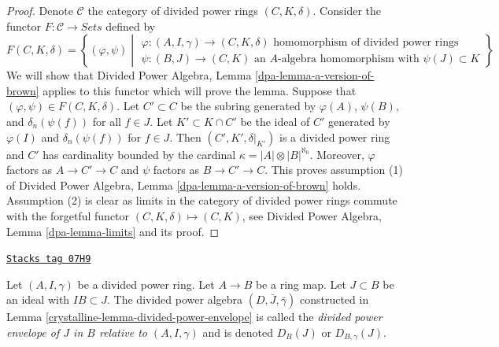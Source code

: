 \begin{proof}
Denote $\mathcal{C}$ the category of divided power rings
$(C, K, \delta)$. Consider the functor
$F : \mathcal{C} \longrightarrow \textit{Sets}$ defined by
$$
F(C, K, \delta) =
\left\{
(\varphi, \psi)
\middle|
\begin{matrix}
\varphi : (A, I, \gamma) \to (C, K, \delta)
\text{ homomorphism of divided power rings} \\
\psi : (B, J) \to (C, K)\text{ an }
A\text{-algebra homomorphism with }\psi(J) \subset K
\end{matrix}
\right\}
$$
We will show that
Divided Power Algebra, Lemma \ref{dpa-lemma-a-version-of-brown}
applies to this functor which will
prove the lemma. Suppose that $(\varphi, \psi) \in F(C, K, \delta)$.
Let $C' \subset C$ be the subring generated by $\varphi(A)$,
$\psi(B)$, and $\delta_n(\psi(f))$ for all $f \in J$.
Let $K' \subset K \cap C'$ be the ideal of $C'$ generated by
$\varphi(I)$ and $\delta_n(\psi(f))$ for $f \in J$.
Then $(C', K', \delta|_{K'})$ is a divided power ring and
$C'$ has cardinality bounded by the cardinal
$\kappa = |A| \otimes |B|^{\aleph_0}$.
Moreover, $\varphi$ factors as $A \to C' \to C$ and $\psi$ factors
as $B \to C' \to C$. This proves assumption (1) of
Divided Power Algebra, Lemma \ref{dpa-lemma-a-version-of-brown}
holds. Assumption (2) is clear
as limits in the category of divided power rings commute with the
forgetful functor $(C, K, \delta) \mapsto (C, K)$, see
Divided Power Algebra, Lemma \ref{dpa-lemma-limits} and its proof.
\end{proof}

\begin{definition}
\label{crystalline-definition-divided-power-envelope}
\href{https://stacks.math.columbia.edu/tag/07H9}{\texttt{Stacks tag 07H9}}

Let $(A, I, \gamma)$ be a divided power ring.
Let $A \to B$ be a ring map. Let $J \subset B$ be an ideal
with $IB \subset J$. The divided power algebra $(D, \bar J, \bar\gamma)$
constructed in Lemma \ref{crystalline-lemma-divided-power-envelope}
is called the {\it divided power envelope of $J$ in $B$
relative to $(A, I, \gamma)$} and is denoted $D_B(J)$ or $D_{B, \gamma}(J)$.
\end{definition}

